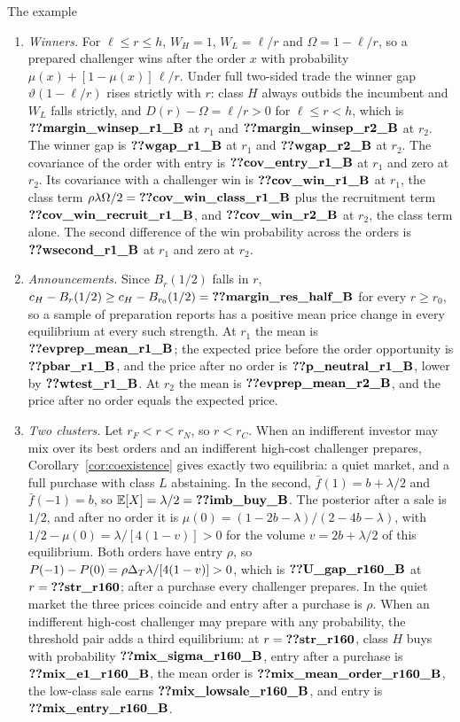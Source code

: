 \begin{named}{The example}
\begin{enumerate}[label=(\alph*),leftmargin=2em]
\item \emph{Winners.} For \(\ell\le r\le h\), \(W_H=1\), \(W_L=\ell/r\) and \(\Omega=1-\ell/r\), so a prepared
challenger wins after the order \(x\) with probability \(\mu(x)+[1-\mu(x)]\,\ell/r\). Under full two-sided trade the
winner gap \(\vartheta(1-\ell/r)\) rises strictly with \(r\): class \(H\) always outbids the incumbent and \(W_L\)
falls strictly, and \(D(r)-\Omega=\ell/r>0\) for \(\ell\le r<h\), which is \(\reg{margin_winsep_r1_B}\) at \(r_1\) and
\(\reg{margin_winsep_r2_B}\) at \(r_2\). The winner gap is \(\reg{wgap_r1_B}\) at \(r_1\) and \(\reg{wgap_r2_B}\) at
\(r_2\). The covariance of the order with entry is \(\reg{cov_entry_r1_B}\) at \(r_1\) and zero at \(r_2\). Its
covariance with a challenger win is \(\reg{cov_win_r1_B}\) at \(r_1\), the class term
\(\rho\lambda\Omega/2=\reg{cov_win_class_r1_B}\) plus the recruitment term \(\reg{cov_win_recruit_r1_B}\), and
\(\reg{cov_win_r2_B}\) at \(r_2\), the class term alone. The second difference of the win probability across the
orders is \(\reg{wsecond_r1_B}\) at \(r_1\) and zero at \(r_2\).
\item \emph{Announcements.} Since \(B_r(1/2)\) falls in \(r\), \(c_H-B_r(1/2)\ge c_H-B_{r_0}(1/2)=\reg{margin_res_half_B}\)
for every \(r\ge r_0\), so a sample of preparation reports has a positive mean price change in every equilibrium at
every such strength. At \(r_1\) the mean is \(\reg{evprep_mean_r1_B}\); the expected price before the order
opportunity is \(\reg{pbar_r1_B}\), and the price after no order is \(\reg{p_neutral_r1_B}\), lower by
\(\reg{wtest_r1_B}\). At \(r_2\) the mean is \(\reg{evprep_mean_r2_B}\), and the price after no order equals the
expected price.
\item \emph{Two clusters.} Let \(r_F<r<r_N\), so \(r<r_C\). When an indifferent investor may mix over its best orders
and an indifferent high-cost challenger prepares, Corollary~\ref{cor:coexistence} gives exactly two equilibria: a
quiet market, and a full purchase with class \(L\) abstaining. In the second, \(\bar f(1)=b+\lambda/2\) and
\(\bar f(-1)=b\), so \(\E[X]=\lambda/2=\reg{imb_buy_B}\). The posterior after a sale is \(1/2\), and after no order it
is \(\mu(0)=(1-2b-\lambda)/(2-4b-\lambda)\), with \(1/2-\mu(0)=\lambda/[4(1-v)]>0\) for the volume \(v=2b+\lambda/2\)
of this equilibrium. Both orders have entry \(\rho\), so \(P(-1)-P(0)=\rho\Delta_T\lambda/[4(1-v)]>0\), which is
\(\reg{U_gap_r160_B}\) at \(r=\reg{str_r160}\); after a purchase every challenger prepares. In the quiet market the
three prices coincide and entry after a purchase is \(\rho\). When an indifferent high-cost challenger may prepare
with any probability, the threshold pair adds a third equilibrium: at \(r=\reg{str_r160}\), class \(H\) buys with
probability \(\reg{mix_sigma_r160_B}\), entry after a purchase is \(\reg{mix_e1_r160_B}\), the mean order is
\(\reg{mix_mean_order_r160_B}\), the low-class sale earns \(\reg{mix_lowsale_r160_B}\), and entry is
\(\reg{mix_entry_r160_B}\).
\end{enumerate}
\end{named}

